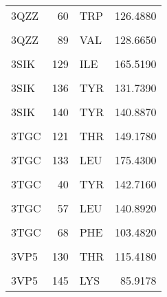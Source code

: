 \begin{table}
\begin{tabular}{lrlr}
			\addlinespace
			3QZZ & 60 & TRP & 126.4880\\
			\cellcolor{gray!6}{3QZZ} & \cellcolor{gray!6}{74} & \cellcolor{gray!6}{PHE} & \cellcolor{gray!6}{94.8642}\\
			3QZZ & 89 & VAL & 128.6650\\
			\cellcolor{gray!6}{3QZZ} & \cellcolor{gray!6}{93} & \cellcolor{gray!6}{PHE} & \cellcolor{gray!6}{111.4380}\\
			3SIK & 129 & ILE & 165.5190\\
			\addlinespace
			\cellcolor{gray!6}{3SIK} & \cellcolor{gray!6}{131} & \cellcolor{gray!6}{ILE} & \cellcolor{gray!6}{134.1420}\\
			3SIK & 136 & TYR & 131.7390\\
			\cellcolor{gray!6}{3SIK} & \cellcolor{gray!6}{138} & \cellcolor{gray!6}{ALA} & \cellcolor{gray!6}{159.2210}\\
			3SIK & 140 & TYR & 140.8870\\
			\cellcolor{gray!6}{3SIK} & \cellcolor{gray!6}{54} & \cellcolor{gray!6}{ARG} & \cellcolor{gray!6}{163.0460}\\
			\addlinespace
			3TGC & 121 & THR & 149.1780\\
			\cellcolor{gray!6}{3TGC} & \cellcolor{gray!6}{123} & \cellcolor{gray!6}{LEU} & \cellcolor{gray!6}{148.3100}\\
			3TGC & 133 & LEU & 175.4300\\
			\cellcolor{gray!6}{3TGC} & \cellcolor{gray!6}{36} & \cellcolor{gray!6}{VAL} & \cellcolor{gray!6}{128.7560}\\
			3TGC & 40 & TYR & 142.7160\\
			\addlinespace
			\cellcolor{gray!6}{3TGC} & \cellcolor{gray!6}{42} & \cellcolor{gray!6}{ALA} & \cellcolor{gray!6}{151.3290}\\
			3TGC & 57 & LEU & 140.8920\\
			\cellcolor{gray!6}{3TGC} & \cellcolor{gray!6}{59} & \cellcolor{gray!6}{HIS} & \cellcolor{gray!6}{124.3700}\\
			3TGC & 68 & PHE & 103.4820\\
			\cellcolor{gray!6}{3VP5} & \cellcolor{gray!6}{112} & \cellcolor{gray!6}{PHE} & \cellcolor{gray!6}{98.9329}\\
			\addlinespace
			3VP5 & 130 & THR & 115.4180\\
			\cellcolor{gray!6}{3VP5} & \cellcolor{gray!6}{131} & \cellcolor{gray!6}{VAL} & \cellcolor{gray!6}{118.6510}\\
			3VP5 & 145 & LYS & 85.9178\\

\end{tabular}
\end{table}
